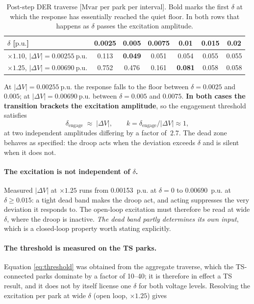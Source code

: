 \documentclass[11pt,a4paper]{article}
\newcommand{\pu}{\ensuremath{\mathrm{p.u.}}}
\newcommand{\Mvar}{\ensuremath{\mathrm{Mvar}}}
\newcommand{\dz}{\ensuremath{\delta}}
\begin{document}
\begin{table}[htbp]
\centering
\begin{tabular}{lcccccc}
\toprule
$\dz$ [\pu] & 0.0025 & 0.005 & 0.0075 & 0.01 & 0.015 & 0.02 \\
\midrule
$\times1.10$, $|\Delta V| = \SI{0.00255}{\pu}$
  & 0.113 & \textbf{0.049} & 0.051 & 0.054 & 0.055 & 0.055 \\
$\times1.25$, $|\Delta V| = \SI{0.00690}{\pu}$
  & 0.752 & 0.476 & 0.161 & \textbf{0.081} & 0.058 & 0.058 \\
\bottomrule
\end{tabular}
\caption{Post-step DER traverse [\si{\Mvar} per park per interval]. Bold marks
the first $\dz$ at which the response has essentially reached the quiet floor.
In both rows that happens as $\dz$ passes the excitation amplitude.}
\label{tab:threshold}
\end{table}

At $|\Delta V| = \SI{0.00255}{\pu}$ the response falls to the floor between
$\dz = 0.0025$ and $0.005$; at $|\Delta V| = \SI{0.00690}{\pu}$ between
$\dz=0.005$ and $0.0075$. \textbf{In both cases the transition brackets the
excitation amplitude}, so the engagement threshold satisfies
\begin{equation}
  \dz_\mathrm{engage} \;\approx\; |\Delta V|,
  \qquad k = \dz_\mathrm{engage}/|\Delta V| \approx 1 ,
  \label{eq:threshold}
\end{equation}
at two independent amplitudes differing by a factor of~$2.7$. The dead zone
behaves as specified: the droop acts when the deviation exceeds $\dz$ and is
silent when it does not.

\paragraph{The excitation is not independent of $\dz$.} Measured $|\Delta V|$ at
$\times1.25$ runs from \SI{0.00153}{\pu} at $\dz=0$ to \SI{0.00690}{\pu} at
$\dz\geq0.015$: a tight dead band makes the droop act, and acting suppresses the
very deviation it responds to. The open-loop excitation must therefore be read
at wide $\dz$, where the droop is inactive. \emph{The dead band partly determines
its own input}, which is a closed-loop property worth stating explicitly.

\paragraph{The threshold is measured on the TS parks.} Equation
\eqref{eq:threshold} was obtained from the aggregate traverse, which the
TS-connected parks dominate by a factor of \numrange{10}{40}; it is therefore in
effect a TS result, and it does not by itself license one $\dz$ for both
voltage levels. Resolving the excitation per park at wide $\dz$ (open loop,
$\times1.25$) gives
\end{document}
